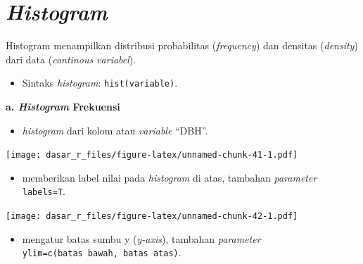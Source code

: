 \documentclass[
  12pt,
  a4paper,
]{scrbook}
\newenvironment{Shaded}{\begin{snugshade}}{\end{snugshade}}
\newcommand{\DataTypeTok}[1]{\textcolor[rgb]{0.13,0.29,0.53}{#1}}
\newcommand{\KeywordTok}[1]{\textcolor[rgb]{0.13,0.29,0.53}{\textbf{#1}}}
\newcommand{\NormalTok}[1]{#1}
\newcommand{\OperatorTok}[1]{\textcolor[rgb]{0.81,0.36,0.00}{\textbf{#1}}}
\providecommand{\tightlist}{%
  \setlength{\itemsep}{0pt}\setlength{\parskip}{0pt}}
\begin{document}
\hypertarget{histogram}{%
\section{\texorpdfstring{\emph{Histogram}}{Histogram}}\label{histogram}}

Histogram menampilkan distribusi probabilitas (\emph{frequency}) dan
densitas (\emph{density}) dari data (\emph{continous variabel}).

\begin{itemize}
\tightlist
\item
  Sintaks \emph{histogram}: \texttt{hist(variable)}.
\end{itemize}

\textbf{a. \emph{Histogram} Frekuensi}

\begin{itemize}
\tightlist
\item
  \emph{histogram} dari kolom atau \emph{variable} ``DBH''.
\end{itemize}

\begin{Shaded}
\end{Shaded}

\texttt{[image: dasar\_r\_files/figure-latex/unnamed-chunk-41-1.pdf]}

\newpage

\begin{itemize}
\tightlist
\item
  memberikan label nilai pada \emph{histogram} di atas, tambahan
  \emph{parameter} \texttt{labels=T}.
\end{itemize}

\begin{Shaded}
\end{Shaded}

\texttt{[image: dasar\_r\_files/figure-latex/unnamed-chunk-42-1.pdf]}

\begin{itemize}
\tightlist
\item
  mengatur batas sumbu y (\emph{y-axis}), tambahan \emph{parameter}
  \texttt{ylim=c(batas\ bawah,\ batas\ atas)}.
\end{itemize}
\end{document}
